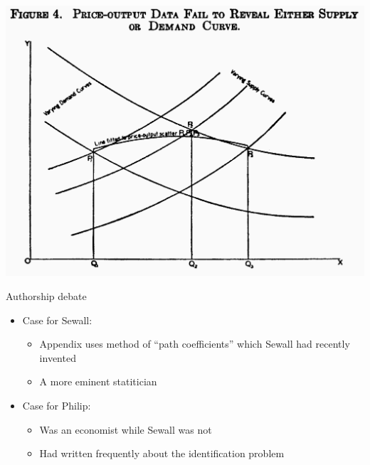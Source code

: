 \documentclass[english]{beamer}
\begin{document}
\begin{frame}{}
\begin{center}
\includegraphics[width=1 \textwidth]{Images/fischer_graph1.png}
\end{center}
\end{frame}

\begin{frame}{Authorship debate}
\begin{itemize}
\setlength{\itemsep}{1.5em}
    \item Case for Sewall:
    \vspace{5pt}
    \begin{itemize}
        \setlength{\itemsep}{0.7em}
        \item Appendix uses method of ``path coefficients'' which Sewall had recently invented
        \item A more eminent statitician
    \end{itemize}
    \item Case for Philip:
    \vspace{5pt}
    \begin{itemize}
        \setlength{\itemsep}{0.7em}
        \item Was an economist while Sewall was not
        \item Had written frequently about the identification problem
    \end{itemize}
\end{itemize}
\end{frame}
\end{document}
